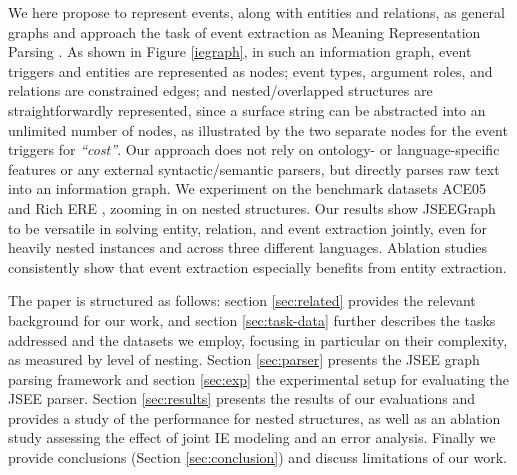 \documentclass[11pt]{article}
\begin{document}
We here propose to represent events, along with entities and relations, as general graphs and approach the task of event extraction as Meaning Representation Parsing \citep{oepen-etal-2020-mrp, samuel-straka-2020-ufal}. %
As shown in Figure \ref{iegraph}, in such an information graph, event triggers and entities are represented as nodes; event types, argument roles, and relations are constrained edges; and nested/overlapped structures are straightforwardly represented, since a surface string can be abstracted into an unlimited number of nodes, as illustrated by the two separate nodes for the event triggers for \textit{``cost''}. Our approach does not rely on ontology- or language-specific features or any external syntactic/semantic parsers, but directly parses raw text into an information graph. 
We experiment on the benchmark datasets ACE05 \citep{doddington-etal-2004-automatic} and Rich ERE \citep{song-etal-2015-light}, zooming in on nested structures. Our results show JSEEGraph to be versatile in solving entity, relation, and event extraction jointly, even for heavily nested instances and across three different languages. Ablation studies consistently show that event extraction especially benefits from entity extraction.

The paper is structured as follows: section \ref{sec:related} provides the relevant background for our work, and section \ref{sec:task-data} further describes the tasks addressed and the datasets we employ, focusing in particular on their complexity, as measured by level of nesting. Section \ref{sec:parser} presents the JSEE graph parsing framework and section \ref{sec:exp} the experimental setup for evaluating the JSEE parser. Section \ref{sec:results} presents the results of our evaluations and provides a study of the performance for nested structures, as well as an ablation study assessing the effect of joint IE modeling and an error analysis. Finally we provide conclusions (Section \ref{sec:conclusion}) and discuss limitations of our work.
\end{document}
